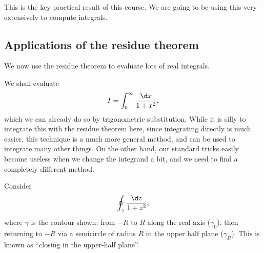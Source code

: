 \documentclass[a4paper]{article}
\begin{document}
This is the key practical result of this course. We are going to be using this very extensively to compute integrals.

\subsection{Applications of the residue theorem}
We now use the residue theorem to evaluate lots of real integrals.
\begin{eg}
  We shall evaluate
  \[
    I = \int_0^\infty \frac{\d x}{1 + x^2},
  \]
  which we can already do so by trigonometric substitution. While it is silly to integrate this with the residue theorem here, since integrating directly is much easier, this technique is a much more general method, and can be used to integrate many other things. On the other hand, our standard tricks easily become useless when we change the integrand a bit, and we need to find a completely different method.

  Consider
  \[
    \oint_\gamma \frac{\d z}{1 + z^2},
  \]
  where $\gamma$ is the contour shown: from $-R$ to $R$ along the real axis ($\gamma_0$), then returning to $-R$ via a semicircle of radius $R$ in the upper half plane ($\gamma_R$). This is known as ``closing in the upper-half plane''.
  \begin{center}
\end{center}
\end{eg}
\end{document}
